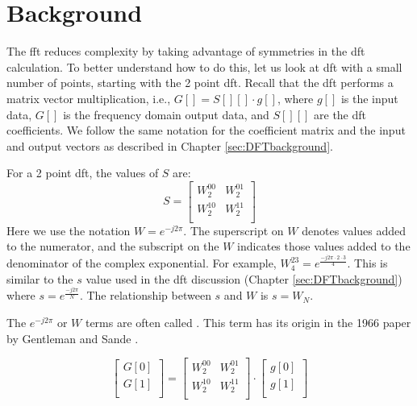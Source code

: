 \section{Background}

The \gls{fft} reduces complexity by taking advantage of symmetries in the \gls{dft} calculation. To better understand how to do this, let us look at \gls{dft} with a small number of points, starting with the 2 point \gls{dft}.  Recall that the \gls{dft} performs a matrix vector multiplication, i.e., $G[] = S[][] \cdot g[]$, where $g[]$ is the input data, $G[]$ is the frequency domain output data, and $S[][]$ are the \gls{dft} coefficients. We follow the same notation for the coefficient matrix and the input and output vectors as described in Chapter \ref{sec:DFTbackground}.

For a 2 point \gls{dft}, the values of $S$ are:
\begin{equation}
S =
 \begin{bmatrix}
  W^{0 0}_2 & W^{0 1}_2  \\
  W^{1 0}_2 & W^{1 1}_2 \\
 \end{bmatrix}
 \end{equation}
Here we use the notation $W = e^{-j 2 \pi}$. The superscript on $W$ denotes values added to the numerator, and the subscript on the $W$ indicates those values added to the denominator of the complex exponential. For example, $W^{2 3}_4 = e^{\frac{-j 2 \pi \cdot 2 \cdot 3}{4}}$. This is similar to the $s$ value used in the \gls{dft} discussion (Chapter \ref{sec:DFTbackground}) where $s = e^{\frac{-j 2 \pi}{N}}$. The relationship between $s$ and $W$ is $s = W_N$.

\begin{aside}
The $e^{-j 2 \pi}$ or $W$ terms are often called . This term has its origin in the 1966 paper by Gentleman and Sande \cite{gentleman1966fast}.
\end{aside}

\begin{equation}
\begin{bmatrix} 
G[0] \\ 
G[1] \\
\end{bmatrix} = 
 \begin{bmatrix}
  W^{0 0}_2 & W^{0 1}_2  \\
  W^{1 0}_2 & W^{1 1}_2 \\
 \end{bmatrix}
 \cdot
  \begin{bmatrix}
  g[0] \\
  g[1]\\
\end{bmatrix}
\end{equation}

